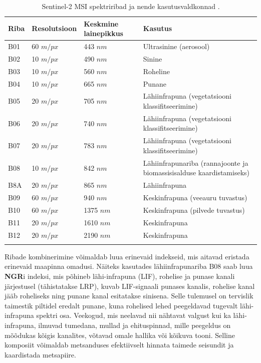 \begin{longtable}{p{1cm}p{1.6cm}p{1.6cm}p{9cm}}
    \hline
    Riba & Resolutsioon & Keskmine lainepikkus & Kasutus                          \\ 
    \hline
    B01  & 60 $m/px$      & 443 $nm$ & Ultrasinine (aerosool)           \\
    B02  & 10 $m/px$      & 490 $nm$ & Sinine                           \\
    B03  & 10 $m/px$      & 560 $nm$ & Roheline                         \\
    B04  & 10 $m/px$      & 665 $nm$ & Punane                           \\
    B05  & 20 $m/px$      & 705 $nm$ & Lähiinfrapuna (vegetatsiooni klassifitseerimine) \\
    B06  & 20 $m/px$      & 740 $nm$ & Lähiinfrapuna (vegetatsiooni klassifitseerimine) \\
    B07  & 20 $m/px$      & 783 $nm$ & Lähiinfrapuna (vegetatsiooni klassifitseerimine) \\
    B08  & 10 $m/px$      & 842 $nm$ & Lähiinfrapunariba (rannajoonte ja biomassisisalduse kaardistamiseks) \\
    B8A  & 20 $m/px$      & 865 $nm$ & Lähiinfrapuna  \\
    B09  & 60 $m/px$      & 940 $nm$ & Keskinfrapuna (veeauru tuvastus)                       \\
    B10  & 60 $m/px$      & 1375 $nm$ & Keskinfrapuna (pilvede tuvastus)                      \\
    B11  & 20 $m/px$      & 1610 $nm$ & Keskinfrapuna       \\
    B12  & 20 $m/px$      & 2190 $nm$ & Keskinfrapuna       \\
    \hline
    \caption{Sentinel-2 MSI spektriribad ja nende kasutusvaldkonnad \cite{S2Mission}.}
    \label{tab:s2bands}
\end{longtable}

Ribade kombinerimine võimaldab luua erinevaid indekseid, mis aitavad
eristada erinevaid maapinna omadusi. Näiteks kasutades lähiinfrapunariba B08 saab luua \textbf{NGR}i indeksi, mis põhineb lähi-infrapuna (LIF), rohelise ja punase kanali järjestusel (tähistatakse LRP), kuvab LIF-signaali punases kanalis, rohelise kanal jääb roheliseks ning punane kanal esitatakse sinisena. Selle tulemusel on tervislik taimestik piltidel eredalt punane, kuna rohelised lehed peegeldavad tugevalt lähi-infrapuna spektri osa. Veekogud, mis neelavad nii nähtavat valgust kui ka lähi-infrapuna, ilmuvad tumedana, mullad ja ehituspinnad, mille peegeldus on mõõdukas kõigis kanalites, võtavad omale hallika või kõikuva tooni. Selline komposiit võimaldab metsanduses efektiivselt hinnata taimede seisundit ja kaardistada metsapiire.

